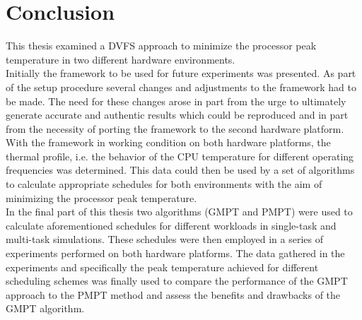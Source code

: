 
\chapter{Conclusion}\label{chapter:conclusion}
This thesis examined a DVFS approach to minimize the processor peak temperature in two different hardware environments.\\
\hspace*{0.5ex}\hspace{0.5ex} Initially the framework to be used for future experiments was presented. As part of the setup procedure several changes and adjustments to the framework had to be made. The need for these changes arose in part from the urge to ultimately generate accurate and authentic results which could be reproduced and in part from the necessity of porting the framework to the second hardware platform.\\
\hspace*{0.5ex}\hspace{0.5ex} With the framework in working condition on both hardware platforms, the thermal profile, i.e. the behavior of the CPU temperature for different operating frequencies was determined. This data could then be used by a set of algorithms to calculate appropriate schedules for both environments with the aim of minimizing the processor peak temperature.\\
\hspace*{0.5ex}\hspace{0.5ex} In the final part of this thesis two algorithms (GMPT and PMPT) were used to calculate aforementioned schedules for different workloads in single-task and multi-task simulations. These schedules were then employed in a series of experiments performed on both hardware platforms. The data gathered in the experiments and specifically the peak temperature achieved for different scheduling schemes was finally used to compare the performance of the GMPT approach to the PMPT method and assess the benefits and drawbacks of the GMPT algorithm.
\afterpage{\null\newpage}